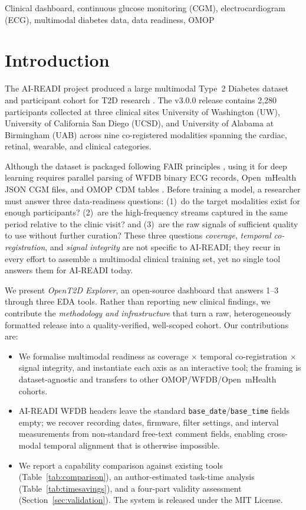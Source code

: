 \documentclass[conference]{IEEEtran}
\begin{document}
\begin{IEEEkeywords}
Clinical dashboard, continuous glucose monitoring (CGM), electrocardiogram (ECG), multimodal diabetes data, data readiness, OMOP
\end{IEEEkeywords}

\section{Introduction}
The AI-READI project produced a large multimodal Type~2 Diabetes dataset and participant cohort for T2D research \cite{ai-readi_consortium_ai-readi_2024}. The v3.0.0 release \cite{ai-readi_consortium_flagship_2025} contains 2,280 participants collected at three clinical sites University of Washington (UW), University of California San Diego (UCSD), and University of Alabama at Birmingham (UAB) across nine co-registered modalities spanning the cardiac, retinal, wearable, and clinical categories.

Although the dataset is packaged following FAIR principles \cite{wilkinson_fair_2016}, using it for deep learning requires parallel parsing of WFDB \cite{moody_wfdb_nodate} binary ECG records, Open~mHealth JSON CGM files, and OMOP CDM tables \cite{hripcsak_george_observational_2015, noauthor_omop_nodate}. Before training a model, a researcher must answer three data-readiness questions: (1)~do the target modalities exist for enough participants? (2)~are the high-frequency streams captured in the same period relative to the clinic visit? and (3)~are the raw signals of sufficient quality to use without further curation? These three questions \emph{coverage}, \emph{temporal co-registration}, and \emph{signal integrity} are not specific to AI-READI; they recur in every effort to assemble a multimodal clinical training set, yet no single tool answers them for AI-READI today.

We present \emph{OpenT2D Explorer}, an open-source dashboard that answers 1--3 through three EDA tools. Rather than reporting new clinical findings, we contribute the \emph{methodology and infrastructure} that turn a raw, heterogeneously formatted release into a quality-verified, well-scoped cohort. Our contributions are:
\begin{itemize}
\item We formalise multimodal readiness as coverage $\times$ temporal co-registration $\times$ signal integrity, and instantiate each axis as an interactive tool; the framing is dataset-agnostic and transfers to other OMOP/WFDB/Open~mHealth cohorts.
\item AI-READI WFDB headers leave the standard \texttt{base\_date}/\texttt{base\_time} fields empty; we recover recording dates, firmware, filter settings, and interval measurements from non-standard free-text comment fields, enabling cross-modal temporal alignment that is otherwise impossible.
\item We report a capability comparison against existing tools (Table~\ref{tab:comparison}), an author-estimated task-time analysis (Table~\ref{tab:timesavings}), and a four-part validity assessment (Section~\ref{sec:validation}). The system is released under the MIT License.
\end{itemize}
\end{document}
